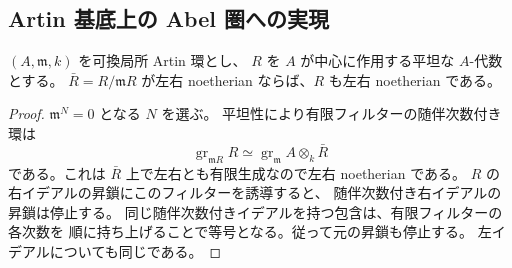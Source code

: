 \subsection{Artin 基底上の Abel 圏への実現}

\begin{lemma}
\label{lem:artin-noetherian-lift}
$(A,\mathfrak m,k)$ を可換局所 Artin 環とし、
$R$ を $A$ が中心に作用する平坦な $A$-代数とする。
$\bar R=R/\mathfrak mR$ が左右 noetherian ならば、$R$ も左右 noetherian である。
\end{lemma}
\begin{proof}
$\mathfrak m^N=0$ となる $N$ を選ぶ。
平坦性により有限フィルターの随伴次数付き環は
\[
 \operatorname{gr}_{\mathfrak mR}R
 \simeq\operatorname{gr}_{\mathfrak m}A\otimes_k\bar R
\]
である。これは $\bar R$ 上で左右とも有限生成なので左右 noetherian である。
$R$ の右イデアルの昇鎖にこのフィルターを誘導すると、
随伴次数付き右イデアルの昇鎖は停止する。
同じ随伴次数付きイデアルを持つ包含は、有限フィルターの各次数を
順に持ち上げることで等号となる。従って元の昇鎖も停止する。
左イデアルについても同じである。
\end{proof}

